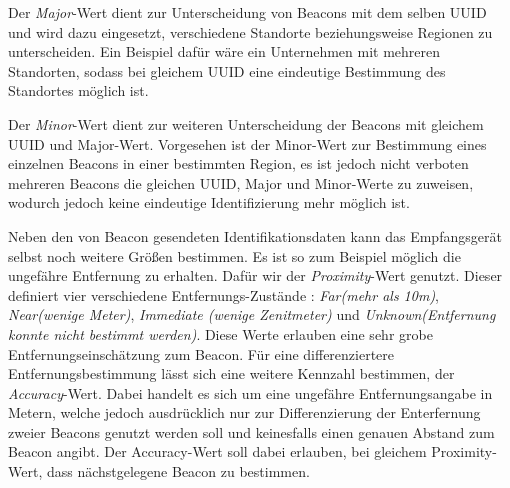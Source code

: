 Der \emph{Major}-Wert dient zur Unterscheidung von Beacons mit dem selben UUID und wird dazu eingesetzt, verschiedene Standorte beziehungsweise Regionen zu unterscheiden. Ein Beispiel dafür wäre ein Unternehmen mit mehreren Standorten, sodass bei gleichem UUID eine eindeutige Bestimmung des Standortes möglich ist.

Der \emph{Minor}-Wert dient zur weiteren Unterscheidung der Beacons mit gleichem UUID und Major-Wert. Vorgesehen ist der Minor-Wert zur Bestimmung eines einzelnen Beacons in einer bestimmten Region, es ist jedoch nicht verboten mehreren Beacons die gleichen UUID, Major und Minor-Werte zu zuweisen, wodurch jedoch keine eindeutige Identifizierung mehr möglich ist. 

Neben den von Beacon gesendeten Identifikationsdaten kann das Empfangsgerät selbst noch weitere Größen bestimmen. Es ist so zum Beispiel möglich die ungefähre Entfernung zu erhalten. 
Dafür wir der \emph{Proximity}-Wert genutzt. Dieser definiert vier verschiedene Entfernungs-Zustände : \textit{Far(mehr als 10m)}, \textit{Near(wenige Meter)}, \textit{Immediate (wenige Zenitmeter)} und \textit{Unknown(Entfernung konnte nicht bestimmt werden)}. 
Diese Werte erlauben eine sehr grobe Entfernungseinschätzung zum Beacon. 
Für eine differenziertere Entfernungsbestimmung lässt sich eine weitere Kennzahl bestimmen, der \textit{Accuracy}-Wert. Dabei handelt es sich um eine ungefähre Entfernungsangabe in Metern, welche jedoch ausdrücklich nur zur Differenzierung der Enterfernung zweier Beacons genutzt werden soll und keinesfalls einen genauen Abstand zum Beacon angibt. Der Accuracy-Wert soll dabei erlauben, bei gleichem Proximity-Wert, dass nächstgelegene Beacon zu bestimmen.


